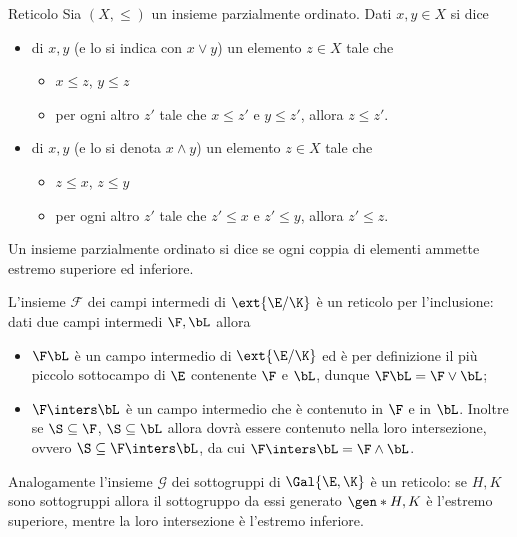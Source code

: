 \begin{definition}
    {Reticolo}{}
    Sia $(X, \leq)$ un insieme parzialmente ordinato. Dati $x, y \in X$ si dice \begin{itemize}
        \item {} di $x, y$ (e lo si indica con $x \lor y$) un elemento $z \in X$ tale che \begin{itemize}
            \item $x \leq z$, $y \leq z$
            \item per ogni altro $z'$ tale che $x \leq z'$ e $y \leq z'$, allora $z \leq z'$.  
        \end{itemize}
        \item {} di $x, y$ (e lo si denota $x \land y$) un elemento $z \in X$ tale che \begin{itemize}
            \item $z \leq x$, $z \leq y$
            \item per ogni altro $z'$ tale che $z' \leq x$ e $z' \leq y$, allora $z' \leq z$.  
        \end{itemize}
    \end{itemize}

    Un insieme parzialmente ordinato si dice  se ogni coppia di elementi ammette estremo superiore ed inferiore.
\end{definition}

L'insieme $\mathscr{F}$ dei campi intermedi di $\ext{\E / \K}$ è un reticolo per l'inclusione: dati due campi intermedi $\F, \bL$ allora \begin{itemize}
    \item $\F\bL$ è un campo intermedio di $\ext{\E / \K}$ ed è per definizione il più piccolo sottocampo di $\E$ contenente $\F$ e $\bL$, dunque $\F\bL = \F \lor \bL$;
    \item $\F \inters \bL$ è un campo intermedio che è contenuto in $\F$ e in $\bL$. Inoltre se $\S \subseteq \F$, $\S \subseteq \bL$ allora dovrà essere contenuto nella loro intersezione, ovvero $\S \subseteq \F \inters \bL$, da cui $\F \inters \bL = \F \land \bL$.    
\end{itemize} Analogamente l'insieme $\mathscr{G}$ dei sottogruppi di $\Gal{\E, \K}$ è un reticolo: se $H, K$ sono sottogruppi allora il sottogruppo da essi generato $\gen*{H, K}$ è l'estremo superiore, mentre la loro intersezione è l'estremo inferiore.

